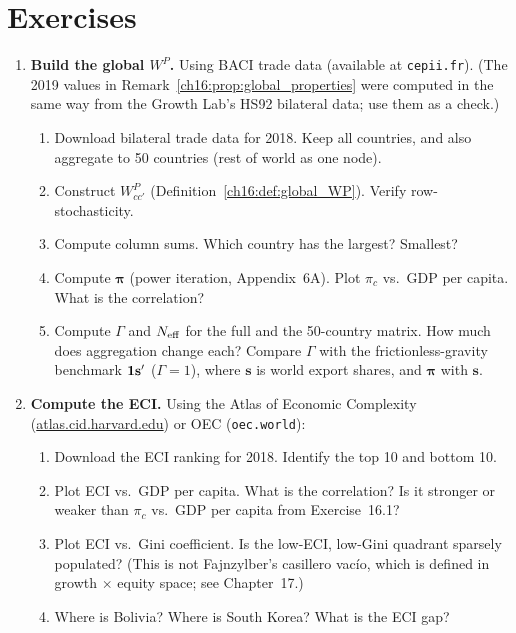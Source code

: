 \documentclass[../structural_economics_book.tex]{subfiles}
\begin{document}
\section{Exercises}
\label{ch16:sec:exercises}

\begin{enumerate}[label=\textbf{16.\arabic*}, leftmargin=3em]

\item \textbf{Build the global $W^P$.}\label{ch16:ex:build} Using BACI trade data (available at \texttt{cepii.fr}). (The 2019 values in Remark~\ref{ch16:prop:global_properties} were computed in the same way from the Growth Lab's HS92 bilateral data; use them as a check.)
\begin{enumerate}
\item Download bilateral trade data for 2018. Keep all countries, and also aggregate to 50 countries (rest of world as one node).
\item Construct $W^P_{cc'}$ (Definition~\ref{ch16:def:global_WP}). Verify row-stochasticity.
\item Compute column sums. Which country has the largest? Smallest?
\item Compute $\boldsymbol{\pi}$ (power iteration, Appendix~6A). Plot $\pi_c$ vs.\ GDP per capita. What is the correlation?
\item Compute $\Gamma$ and $N_{\text{eff}}$ for the full and the 50-country matrix. How much does aggregation change each? Compare $\Gamma$ with the frictionless-gravity benchmark $\mathbf{1}\mathbf{s}'$ ($\Gamma = 1$), where $\mathbf{s}$ is world export shares, and $\boldsymbol{\pi}$ with $\mathbf{s}$.
\end{enumerate}

\item \textbf{Compute the ECI.} Using the Atlas of Economic Complexity (\url{atlas.cid.harvard.edu}) or OEC (\texttt{oec.world}):
\begin{enumerate}
\item Download the ECI ranking for 2018. Identify the top 10 and bottom 10.
\item Plot ECI vs.\ GDP per capita. What is the correlation? Is it stronger or weaker than $\pi_c$ vs.\ GDP per capita from Exercise~16.1?
\item Plot ECI vs.\ Gini coefficient. Is the low-ECI, low-Gini quadrant sparsely populated? (This is not Fajnzylber's casillero vac\'{i}o, which is defined in growth $\times$ equity space; see Chapter~17.)
\item Where is Bolivia? Where is South Korea? What is the ECI gap?
\end{enumerate}


\end{enumerate}
\end{document}
